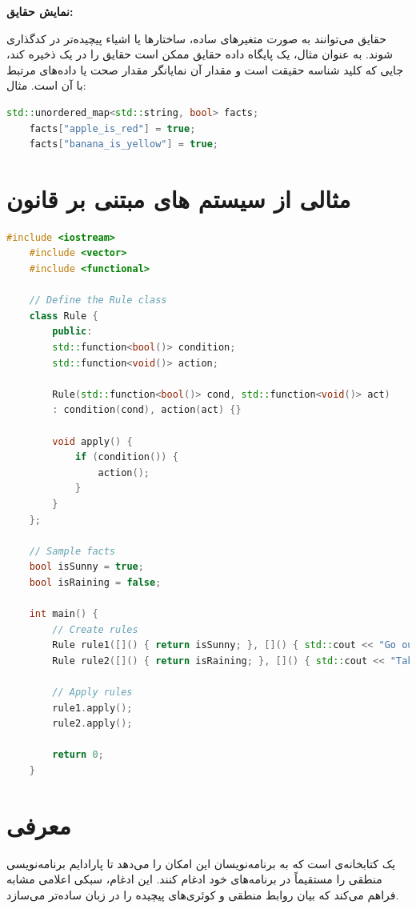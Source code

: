 \documentclass[12pt, a4paper]{report}
\begin{document}
 \textbf{نمایش حقایق:} 

حقایق می‌توانند به صورت متغیرهای ساده، ساختارها یا اشیاء پیچیده‌تر در  کدگذاری شوند. به عنوان مثال، یک پایگاه داده حقایق ممکن است حقایق را در یک  ذخیره کند، جایی که کلید شناسه حقیقت است و مقدار آن نمایانگر مقدار صحت یا داده‌های مرتبط با آن است.
مثال:
 \begin{LTR}
	\begin{lstlisting}[language=C++, breaklines=true]
	std::unordered_map<std::string, bool> facts;
	facts["apple_is_red"] = true;
	facts["banana_is_yellow"] = true;
	\end{lstlisting}
\end{LTR}

\section{مثالی از سیستم ‌های مبتنی بر قانون}
 \begin{LTR}
	\begin{lstlisting}[language=C++, breaklines=true]
	#include <iostream>
	#include <vector>
	#include <functional>
	
	// Define the Rule class
	class Rule {
		public:
		std::function<bool()> condition;
		std::function<void()> action;
		
		Rule(std::function<bool()> cond, std::function<void()> act)
		: condition(cond), action(act) {}
		
		void apply() {
			if (condition()) {
				action();
			}
		}
	};
	
	// Sample facts
	bool isSunny = true;
	bool isRaining = false;
	
	int main() {
		// Create rules
		Rule rule1([]() { return isSunny; }, []() { std::cout << "Go outside and play!\n"; });
		Rule rule2([]() { return isRaining; }, []() { std::cout << "Take an umbrella!\n"; });
		
		// Apply rules
		rule1.apply();
		rule2.apply();
		
		return 0;
	}
	\end{lstlisting}
\end{LTR}


	
	\section{معرفی }
	 یک کتابخانه‌ی  است که به برنامه‌نویسان این امکان را می‌دهد تا پارادایم برنامه‌نویسی منطقی را مستقیماً در برنامه‌های  خود ادغام کنند. این ادغام، سبکی اعلامی مشابه  فراهم می‌کند که بیان روابط منطقی و کوئری‌های پیچیده را در زبان  ساده‌تر می‌سازد.
	
\end{document}
